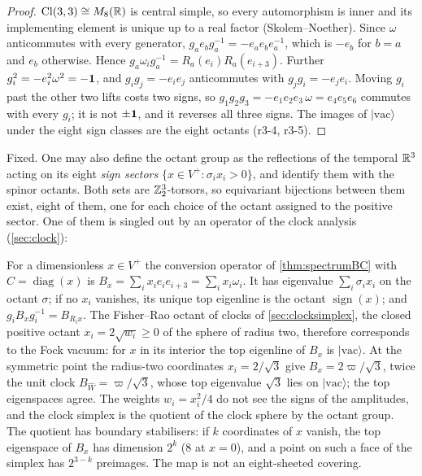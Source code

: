 \begin{proof}
$\mathrm{Cl}(3,3)\cong M_8(\mathbb{R})$ is central simple, so every automorphism is inner and its implementing element is unique up to a real factor
(Skolem--Noether). Since $\omega$ anticommutes with every generator, $g_ae_bg_a^{-1}=-e_ae_be_a^{-1}$, which is $-e_b$ for $b=a$ and $e_b$
otherwise. Hence $g_a\omega_ig_a^{-1}=R_a(e_i)R_a(e_{i+3})$. Further $g_i^2=-e_i^2\omega^2=-\mathbf 1$, and $g_ig_j=-e_ie_j$ anticommutes with
$g_jg_i=-e_je_i$. Moving $g_i$ past the other two lifts costs two signs, so $g_1g_2g_3=-e_1e_2e_3\,\omega=e_4e_5e_6$ commutes with every $g_i$; it is
not $\pm\mathbf 1$, and it reverses all three signs. The images of $|\mathrm{vac}\rangle$ under the eight sign classes are the eight octants
(r3-4, r3-5).
\end{proof}

Fixed. One may also define the octant group as the reflections of the temporal $\mathbb{R}^3$ acting on its eight \emph{sign sectors}
$\{x\in V^+:\sigma_ix_i>0\}$, and identify them with the spinor octants. Both sets are $\mathbb{Z}_2^3$-torsors, so equivariant bijections
between them exist, eight of them, one for each choice of the octant assigned to the positive sector. One of them is singled out by an operator of the clock analysis (\cref{sec:clock}):

\begin{proposition}
\label{r3:prop:clock}
For a dimensionless $x\in V^+$ the conversion operator of \cref{thm:spectrumBC} with $C=\operatorname{diag}(x)$ is
$B_x=\sum_ix_ie_ie_{i+3}=\sum_ix_i\omega_i$. It has eigenvalue $\sum_i\sigma_ix_i$ on the octant $\sigma$; if no $x_i$ vanishes, its unique top
eigenline is the octant $\operatorname{sign}(x)$; and $g_iB_xg_i^{-1}=B_{R_ix}$. The Fisher--Rao octant of clocks of \cref{sec:clocksimplex},
the closed positive octant $x_i=2\sqrt{w_i}\ge0$ of the sphere of radius two, therefore corresponds to the Fock vacuum: for $x$ in its
interior the top eigenline of $B_x$ is $|\mathrm{vac}\rangle$. At the symmetric point the radius-two coordinates $x_i=2/\sqrt3$ give
$B_x=2\varpi/\sqrt3$, twice the unit clock $B_{\widehat W}=\varpi/\sqrt3$, whose top eigenvalue $\sqrt3$ lies on $|\mathrm{vac}\rangle$; the top
eigenspaces agree. The weights $w_i=x_i^2/4$ do not see the signs of the amplitudes, and the clock simplex is the quotient of the clock sphere by
the octant group. The quotient has boundary stabilisers: if $k$ coordinates of $x$ vanish, the top eigenspace of $B_x$ has dimension $2^k$
($8$ at $x=0$), and a point on such a face of the simplex has $2^{3-k}$ preimages. The map is not an eight-sheeted covering.
\end{proposition}

